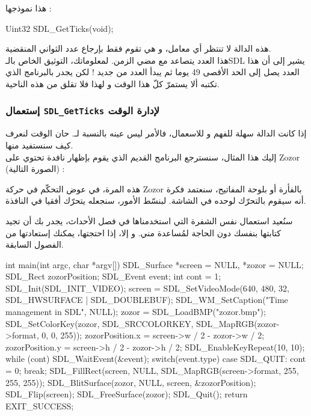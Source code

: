 هذا نموذجها :

\begin{Csource}
Uint32 SDL_GetTicks(void);
\end{Csource}

هذه الدالة لا تنتظر أي معامل، و هي تقوم فقط بإرجاع عدد الثواني المنقضية. \\
هذا العدد يتصاعد مع مضي الزمن. لمعلوماتك، التوثيق الخاص بالـ\textenglish{SDL}
يشير إلى أن هذا العدد يصل إلى الحد الأقصى 49 يوما ثم يبدأ العدد من جديد ! لكن يجدر بالبرنامج الذي تكتبه ألا يستمرّ كلّ هذا الوقت و لهذا فلا تقلق من هذه الناحية.

\subsubsection{إستعمال \texttt{SDL\_GetTicks} لإدارة الوقت}

إذا كانت الدالة
سهلة للفهم و للاسعمال، فالأمر ليس عينه بالنسبة لـ.
حان الوقت لنعرف كيف سنستفيد منها.\\
إليك هذا المثال، سنسترجع البرنامج القديم الذي يقوم بإظهار نافدة تحتوي على
\textenglish{Zozor}
(الصورة التالية) :


هذه المرة، في عوض التحكّم في حركة
\textenglish{Zozor}
بالفأرة أو بلوحة المفاتيح، سنعتمد فكرة أنه سيقوم بالتحرّك لوحده في الشاشة. لبنسّط الأمور، سنجعله يتحرّك أفقيا في النافذة. 

سنُعيد استعمال نفس الشفرة التي استخدمناها في فصل الأحداث، يجدر بك أن تجيد كتابتها بنفسك دون الحاجة لمُساعدة مني. و إلا،  إذا احتجتها، يمكنك إستعادتها من الفصول السابقة.

\begin{Csource}
int main(int argc, char *argv[])
{
	SDL_Surface *screen = NULL, *zozor = NULL;
	SDL_Rect zozorPosition;
	SDL_Event event;
	int cont = 1;
	SDL_Init(SDL_INIT_VIDEO);
	screen = SDL_SetVideoMode(640, 480, 32, SDL_HWSURFACE | SDL_DOUBLEBUF);
	SDL_WM_SetCaption("Time management in SDL", NULL);
	zozor = SDL_LoadBMP("zozor.bmp");
	SDL_SetColorKey(zozor, SDL_SRCCOLORKEY, SDL_MapRGB(zozor->format, 0, 0, 255));
	zozorPosition.x = screen->w / 2 - zozor->w / 2;
	zozorPosition.y = screen->h / 2 - zozor->h / 2;
	SDL_EnableKeyRepeat(10, 10);
	while (cont)
	{
		SDL_WaitEvent(&event);
		switch(event.type)
		{
			case SDL_QUIT:
			cont = 0;
			break;
		}
		SDL_FillRect(screen, NULL, SDL_MapRGB(screen->format, 255, 255, 255));
		SDL_BlitSurface(zozor, NULL, screen, &zozorPosition);
		SDL_Flip(screen);
	}
	SDL_FreeSurface(zozor);
	SDL_Quit();
	return EXIT_SUCCESS;
}
\end{Csource}

